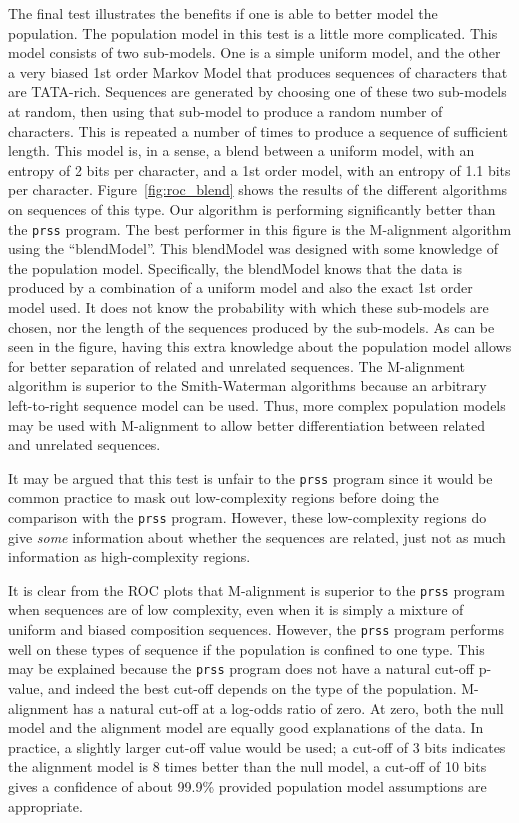 \documentclass[a4paper,11pt,oneside]{article}
\begin{document}
The final test illustrates the benefits if one is able to better model the
population.  The population model in this test is a little more complicated.
This model consists of two sub-models.  One is a simple uniform model, and the
other a very biased 1st order Markov Model that produces sequences of
characters that are TATA-rich.  Sequences are generated by
choosing one of these two sub-models at random, then using that sub-model to
produce a random number of characters.  This is repeated a number of times to
produce a sequence of sufficient length.  This model is, in a sense, a blend
between a uniform model, with an entropy of 2 bits per character, and a 1st
order model, with an entropy of 1.1 bits per character.
Figure~\ref{fig:roc_blend} shows the results of the different algorithms on
sequences of this type.  Our algorithm is performing significantly better than
the \verb!prss! program.  The best performer in this figure is the M-alignment
algorithm using the ``blendModel''.  This blendModel was designed with some
knowledge of the population model.  Specifically, the blendModel knows that
the data is produced by a combination of a uniform model and also the exact
1st order model used.  It does not know the probability with which these
sub-models are chosen, nor the length of the sequences produced by the
sub-models.  As can be seen in the figure, having this extra knowledge about
the population model allows for better separation of related and unrelated
sequences.  The M-alignment algorithm is superior to the Smith-Waterman
algorithms because an arbitrary left-to-right sequence model can be used.
Thus, more complex population models may be used with M-alignment to allow
better differentiation between related and unrelated sequences.


It may be argued that this test is unfair to the \verb!prss! program since it
would be common practice to mask out low-complexity regions before doing the
comparison with the \verb!prss! program.  However, these low-complexity
regions do give \emph{some} information about whether the sequences are
related, just not as much information as high-complexity regions.



It is clear from the ROC plots that M-alignment is superior to
the \verb!prss! program when sequences are of low complexity, even when it is
simply a mixture of uniform and biased composition sequences.  However, the
\verb!prss! program performs well on these types of sequence if the population
is confined to one type.  This may be explained because the \verb!prss!
program does not have a natural cut-off p-value, and indeed the best cut-off
depends on the type of the population.  M-alignment has a natural cut-off at a
log-odds ratio of zero.  At zero, both the null model and the alignment model
are equally good explanations of the data.  In practice, a slightly larger
cut-off value would be used; a cut-off of 3 bits indicates the alignment model
is 8 times better than the null model, a cut-off of 10 bits gives a confidence
of about 99.9\% provided population model assumptions are appropriate.
\end{document}

